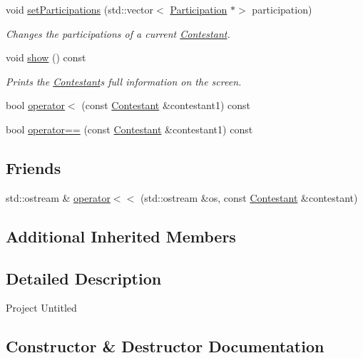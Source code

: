 \begin{DoxyCompactItemize}
void \hyperlink{class_contestant_a0ca184f1d5064ad78e7b5f643c8e4f42}{set\+Participations} (std\+::vector$<$ \hyperlink{struct_participation}{Participation} $\ast$$>$ participation)
\begin{DoxyCompactList}\small\item\em Changes the participations of a current \hyperlink{class_contestant}{Contestant}. \end{DoxyCompactList}\item 
\mbox{\label{class_contestant_a7c89f356696d59b7ccb762d09451def3}} 
void \hyperlink{class_contestant_a7c89f356696d59b7ccb762d09451def3}{show} () const
\begin{DoxyCompactList}\small\item\em Prints the \hyperlink{class_contestant}{Contestant}\textquotesingle{}s full information on the screen. \end{DoxyCompactList}\item 
bool \hyperlink{class_contestant_ae51d0d7eb8a0cf2e70f0cfe92c74e7ae}{operator$<$} (const \hyperlink{class_contestant}{Contestant} \&contestant1) const
\item 
bool \hyperlink{class_contestant_a6d1d627ddf49dc5d3b77a6d42a3680fd}{operator==} (const \hyperlink{class_contestant}{Contestant} \&contestant1) const
\end{DoxyCompactItemize}
\subsection*{Friends}
\begin{DoxyCompactItemize}
\item 
std\+::ostream \& \hyperlink{class_contestant_af6619c3c4998b08f93ea4a4568201ebe}{operator$<$$<$} (std\+::ostream \&os, const \hyperlink{class_contestant}{Contestant} \&contestant)
\end{DoxyCompactItemize}
\subsection*{Additional Inherited Members}


\subsection{Detailed Description}
Project Untitled 

\subsection{Constructor \& Destructor Documentation}
\mbox{\label{class_contestant_a4f6ad68b8ea17d3cfc18581f62ea4806}} 
